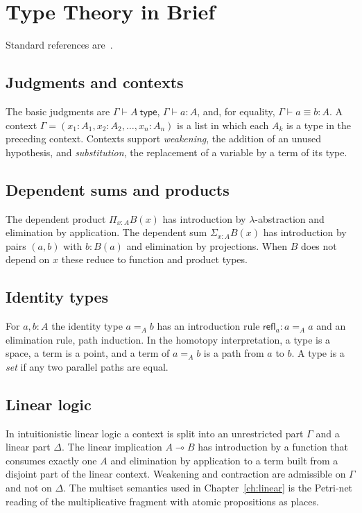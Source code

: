 \chapter{Type Theory in Brief}
\label{app:types}

Standard references are~\cite{martinlof1984,hottbook2013,girard1987}.

\section*{Judgments and contexts}

The basic judgments are $\Gamma\vdash A\ \mathsf{type}$, $\Gamma\vdash a:A$, and, for equality, $\Gamma\vdash a\equiv b:A$. A context $\Gamma=(x_1:A_1,x_2:A_2,\dots,x_n:A_n)$ is a list in which each $A_k$ is a type in the preceding context. Contexts support \emph{weakening}, the addition of an unused hypothesis, and \emph{substitution}, the replacement of a variable by a term of its type.

\section*{Dependent sums and products}

The dependent product $\Pi_{x:A}B(x)$ has introduction by $\lambda$-abstraction and elimination by application. The dependent sum $\Sigma_{x:A}B(x)$ has introduction by pairs $(a,b)$ with $b:B(a)$ and elimination by projections. When $B$ does not depend on $x$ these reduce to function and product types.

\section*{Identity types}

For $a,b:A$ the identity type $a=_Ab$ has an introduction rule $\mathsf{refl}_a:a=_Aa$ and an elimination rule, path induction. In the homotopy interpretation, a type is a space, a term is a point, and a term of $a=_Ab$ is a path from $a$ to $b$. A type is a \emph{set} if any two parallel paths are equal.

\section*{Linear logic}

In intuitionistic linear logic a context is split into an unrestricted part $\Gamma$ and a linear part $\Delta$. The linear implication $A\multimap B$ has introduction by a function that consumes exactly one $A$ and elimination by application to a term built from a disjoint part of the linear context. Weakening and contraction are admissible on $\Gamma$ and not on $\Delta$. The multiset semantics used in Chapter~\ref{ch:linear} is the Petri-net reading of the multiplicative fragment with atomic propositions as places.
